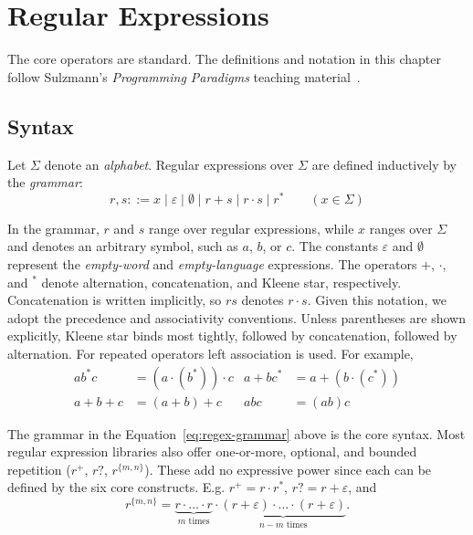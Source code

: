 \chapter{Regular Expressions}
\label{sec:regular-expressions}

The core operators are standard.
The definitions and notation in this chapter 
follow Sulzmann's \emph{Programming Paradigms} 
teaching material~\citep{sulzmann_slides}.

%
%
%

\section{Syntax}
\label{sec:regex-syntax}

Let $\Sigma$ denote an \emph{alphabet}. Regular expressions over $\Sigma$ are
defined inductively by the \emph{grammar}:
\begin{equation}\label{eq:regex-grammar}
r,s ::= x \mid \varepsilon \mid \emptyset
      \mid r+s \mid r\cdot s \mid r^*
\qquad (x\in\Sigma)
\end{equation}

In the grammar, $r$ and $s$ range over regular expressions, 
while $x$ ranges over $\Sigma$ and denotes an arbitrary symbol, 
such as $a$, $b$, or $c$. 
The constants $\varepsilon$ and $\emptyset$ represent the 
\emph{empty-word} and \emph{empty-language} expressions. 
The operators $+$, $\cdot$,
and $^*$ denote alternation, concatenation, and Kleene star, respectively.
Concatenation is written implicitly, so $rs$ denotes $r \cdot s$.
Given this notation, we adopt the precedence and associativity conventions. 
Unless parentheses are shown explicitly, Kleene star binds most tightly, 
followed by concatenation, followed by alternation. 
For repeated operators left association is used. For example,
\begin{align*}
ab^*c &= (a\cdot(b^*))\cdot c & a+bc^* &= a+(b\cdot(c^*)) \\
a+b+c &= (a+b)+c & abc &= (ab)c
\end{align*}

The grammar in the Equation~\eqref{eq:regex-grammar} above is the core syntax. 
Most regular expression libraries also offer one-or-more, optional, 
and bounded repetition ($r^+$, $r?$, $r^{\{m,n\}}$).
These add no expressive power 
since each can be defined by the six core constructs.
E.g.
$r^+ = r\cdot r^*$, $r? = r+\varepsilon$, and
\[
r^{\{m,n\}} = \underbrace{r\cdot\ldots\cdot r}_{m\text{ times}}
\cdot
\underbrace{(r+\varepsilon)\cdot\ldots\cdot(r+\varepsilon)}_{n-m\text{ times}}.
\]

